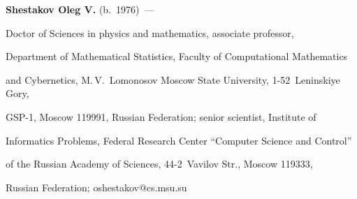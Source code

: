 






\Contrl



\noindent

\textbf{Shestakov Oleg V.} (b.\ 1976)~--- 

Doctor of Sciences in physics and mathematics, associate professor, 

Department of Mathematical Statistics, Faculty of Computational Mathematics 

and Cybernetics, M.\,V.~Lomonosov Moscow State University, 1-52~Leninskiye Gory, 

GSP-1, Moscow 119991, Russian Federation; senior scientist, Institute of 

Informatics Problems, Federal Research Center ``Computer Science and Control''

of the Russian Academy of Sciences, 44-2~Vavilov Str., Moscow 119333, 

Russian Federation; \mbox{oshestakov@cs.msu.su}

\label{end\stat}





\renewcommand{\bibname}{\protect\rm Литература} 


